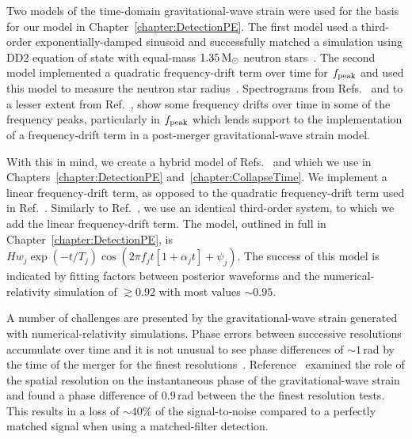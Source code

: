 \documentclass[../Thesis.tex]{subfiles}
\begin{document}
    
    Two models of the time-domain gravitational-wave strain were used for the basis for our model in Chapter~\ref{chapter:DetectionPE}.
    The first model used a third-order exponentially-damped sinusoid and successfully matched a simulation using DD2 equation of state with equal-mass $1.35\,\mathrm{M}_{\odot}$ neutron stars~\cite{Bauswein2016}.
    The second model implemented a quadratic frequency-drift term over time for $f_{\mathrm{peak}}$ and used this model  to measure the neutron star radius~\cite{Bose2018}.
    Spectrograms from Refs.~\cite{Rezzolla2016,Dietrich2017,Dietrich2017a} and to a lesser extent from Ref.~\cite{Maione2017}, show some frequency drifts over time in some of the frequency peaks, particularly in $f_{\mathrm{peak}}$ which lends support to the implementation of a frequency-drift term in a post-merger gravitational-wave strain model.
      \par
    
    With this in mind, we create a hybrid model of Refs.~\cite{Bauswein2016} and \cite{Bose2018} which we use in Chapters~\ref{chapter:DetectionPE} and~\ref{chapter:CollapseTime}. 
    We implement a linear frequency-drift term, as opposed to the quadratic frequency-drift term used in Ref.~\cite{Bose2018}.
    Similarly to Ref.~\cite{Bauswein2016}, we use an identical third-order system, to which we add the linear frequency-drift term.
    The model, outlined in full in Chapter~\ref{chapter:DetectionPE}, is $H w_j \exp(-t/T_j) \cos \left(2\pi f_j t\left[1+\alpha_j t\right]+\psi_j \right)$.
    The success of this model is indicated by fitting factors between posterior waveforms and the numerical-relativity simulation of $\gtrsim 0.92$ with most values $\sim 0.95$.
    \par
    
    A number of challenges are presented by the gravitational-wave strain generated with numerical-relativity simulations.
    Phase errors between successive resolutions accumulate over time and it is not unusual to see phase differences of $\sim 1$\,rad by the time of the merger for the finest resolutions~\cite[e.g.,][]{Radice2014b}.
    Reference~\cite{Takami2015} examined the role of the spatial resolution on the instantaneous phase of the gravitational-wave strain and found a phase difference of $0.9$\,rad between the the finest resolution tests.
    This results in a loss of $\sim 40\%$ of the signal-to-noise compared to a perfectly matched signal when using a matched-filter detection. \par
    
\end{document}
